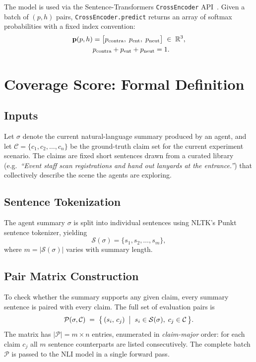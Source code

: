 \documentclass[10pt,twocolumn]{article}
\begin{document}
The model is used via the Sentence-Transformers
\texttt{CrossEncoder} API~\cite{reimers2019sentence}.
Given a batch of $(p, h)$ pairs, \texttt{CrossEncoder.predict} returns an
array of softmax probabilities with a fixed index convention:
%
\begin{align}
  \mathbf{p}(p, h) &=
  \bigl[p_{\text{contra}},\; p_{\text{ent}},\; p_{\text{neut}}\bigr]
  \;\in\; \mathbb{R}^{3}, \notag \\
  &p_{\text{contra}} + p_{\text{ent}} + p_{\text{neut}} = 1.
  \label{eq:nli-output}
\end{align}

\section{Coverage Score: Formal Definition}

\subsection{Inputs}

Let $\sigma$ denote the current natural-language summary produced by an
agent, and let
$\mathcal{C} = \{c_1, c_2, \ldots, c_n\}$
be the ground-truth claim set for the current experiment scenario. The
claims are fixed short sentences drawn from a curated library (e.g.\
\emph{``Event staff scan registrations and hand out lanyards at the
entrance.''}) that collectively describe the scene the agents are
exploring.

\subsection{Sentence Tokenization}

The agent summary $\sigma$ is split into individual sentences using
NLTK's Punkt sentence tokenizer, yielding
%
\begin{equation}
  \mathcal{S}(\sigma) = \{s_1, s_2, \ldots, s_m\},
  \label{eq:sent-tok}
\end{equation}
%
where $m = |\mathcal{S}(\sigma)|$ varies with summary length.

\subsection{Pair Matrix Construction}

To check whether the summary supports any given claim, every summary
sentence is paired with every claim. The full set of evaluation pairs is
%
\begin{equation}
  \mathcal{P}(\sigma, \mathcal{C})
  \;=\;
  \bigl\{\,(s_i,\, c_j)\;\bigm|\; s_i \in \mathcal{S}(\sigma),\;
  c_j \in \mathcal{C}\,\bigr\}.
  \label{eq:pair-matrix}
\end{equation}
%
The matrix has $|\mathcal{P}| = m \times n$ entries, enumerated in
\emph{claim-major} order: for each claim $c_j$ all $m$ sentence
counterparts are listed consecutively. The complete batch $\mathcal{P}$
is passed to the NLI model in a single forward pass.
\end{document}
